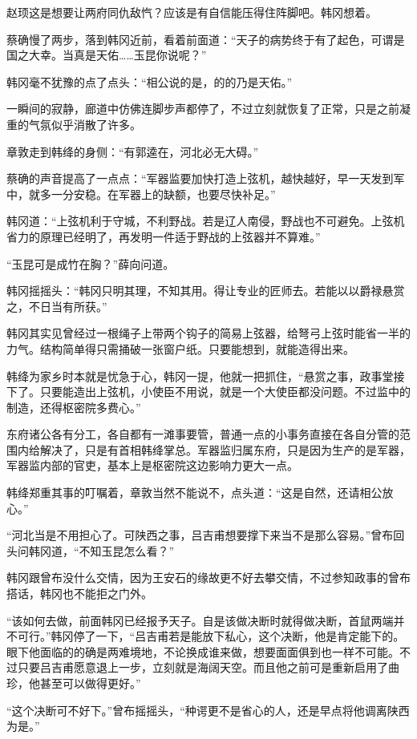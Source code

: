赵顼这是想要让两府同仇敌忾？应该是有自信能压得住阵脚吧。韩冈想着。

蔡确慢了两步，落到韩冈近前，看着前面道：“天子的病势终于有了起色，可谓是国之大幸。当真是天佑……玉昆你说呢？”

韩冈毫不犹豫的点了点头：“相公说的是，的的乃是天佑。”

一瞬间的寂静，廊道中仿佛连脚步声都停了，不过立刻就恢复了正常，只是之前凝重的气氛似乎消散了许多。

章敦走到韩绛的身侧：“有郭逵在，河北必无大碍。”

蔡确的声音提高了一点点：“军器监要加快打造上弦机，越快越好，早一天发到军中，就多一分安稳。在军器上的缺额，也要尽快补足。”

韩冈道：“上弦机利于守城，不利野战。若是辽人南侵，野战也不可避免。上弦机省力的原理已经明了，再发明一件适于野战的上弦器并不算难。”

“玉昆可是成竹在胸？”薛向问道。

韩冈摇摇头：“韩冈只明其理，不知其用。得让专业的匠师去。若能以以爵禄悬赏之，不日当有所获。”

韩冈其实见曾经过一根绳子上带两个钩子的简易上弦器，给弩弓上弦时能省一半的力气。结构简单得只需捅破一张窗户纸。只要能想到，就能造得出来。

韩绛为家乡时本就是忧急于心，韩冈一提，他就一把抓住，“悬赏之事，政事堂接下了。只要能造出上弦机，小使臣不用说，就是一个大使臣都没问题。不过监中的制造，还得枢密院多费心。”

东府诸公各有分工，各自都有一滩事要管，普通一点的小事务直接在各自分管的范围内给解决了，只是有首相韩绛掌总。军器监归属东府，只是因为生产的是军器，军器监内部的官吏，基本上是枢密院这边影响力更大一点。

韩绛郑重其事的叮嘱着，章敦当然不能说不，点头道：“这是自然，还请相公放心。”

“河北当是不用担心了。可陕西之事，吕吉甫想要撑下来当不是那么容易。”曾布回头问韩冈道，“不知玉昆怎么看？”

韩冈跟曾布没什么交情，因为王安石的缘故更不好去攀交情，不过参知政事的曾布搭话，韩冈也不能拒之门外。

“该如何去做，前面韩冈已经报予天子。自是该做决断时就得做决断，首鼠两端并不可行。”韩冈停了一下，“吕吉甫若是能放下私心，这个决断，他是肯定能下的。眼下他面临的的确是两难境地，不论换成谁来做，想要面面俱到也一样不可能。不过只要吕吉甫愿意退上一步，立刻就是海阔天空。而且他之前可是重新启用了曲珍，他甚至可以做得更好。”

“这个决断可不好下。”曾布摇摇头，“种谔更不是省心的人，还是早点将他调离陕西为是。”

